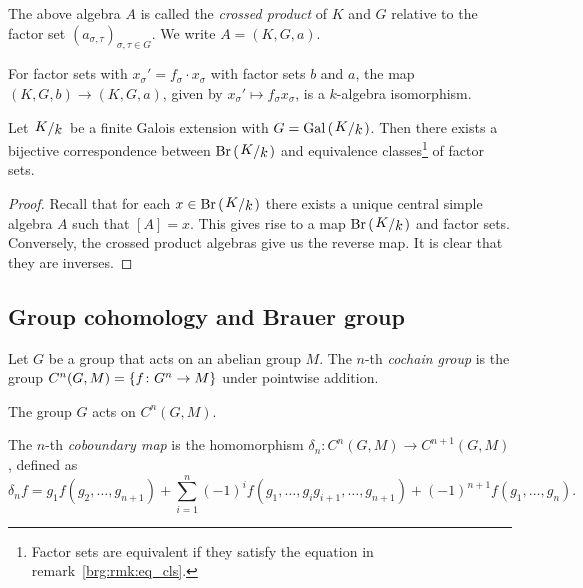 \begin{definicija}
The above algebra $A$ is called the
\emph{crossed product} of $K$ and $G$
relative to the factor set
$(a_{\sigma, \tau})_{\sigma, \tau \in G}$. We write
$A = (K, G, a)$.
\end{definicija}

\begin{lema}
For factor sets with $x_\sigma' = f_\sigma \cdot x_\sigma$ with
factor sets $b$ and $a$, the map $(K, G, b) \to (K, G, a)$, given
by $x_\sigma' \mapsto f_\sigma x_\sigma$, is a $k$-algebra
isomorphism.
\end{lema}

\begin{izrek}
Let $\kvoc{K}{k}$ be a finite Galois extension with
$G = \Gal \br{\kvoc{K}{k}}$. Then there exists a bijective
correspondence between $\Br \br{\kvoc{K}{k}}$ and equivalence
classes\footnote{Factor sets are equivalent if they satisfy the
equation in remark~\ref{brg:rmk:eq_cls}.} of factor sets.
\end{izrek}

\begin{proof}
Recall that for each $x \in \Br \br{\kvoc{K}{k}}$ there exists a
unique central simple algebra $A$ such that $[A] = x$. This gives
rise to a map $\Br \br{\kvoc{K}{k}}$ and factor sets. Conversely,
the crossed product algebras give us the reverse map. It is clear
that they are inverses.
\end{proof}

\newpage

\subsection{Group cohomology and Brauer group}

\begin{definicija}
Let $G$ be a group that acts on an abelian group $M$. The $n$-th
\emph{cochain group} is the group
$C^n(G, M) = \left\{f \colon G^n \to M\right\}$ under pointwise addition.
\end{definicija}

\begin{opomba}
The group $G$ acts on $C^n(G, M)$.
\end{opomba}

\begin{definicija}
The $n$-th \emph{coboundary map} is the
homomorphism $\delta_n \colon C^n(G, M) \to C^{n+1}(G, M)$, defined
as
\[
\delta_n f =
g_1 f(g_2, \dots, g_{n+1}) +
\sum_{i=1}^n (-1)^i f(g_1, \dots, g_i g_{i+1}, \dots, g_{n+1}) +
(-1)^{n+1} f(g_1, \dots, g_n).
\]
\end{definicija}

